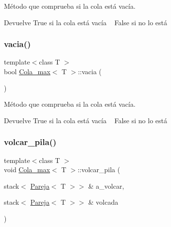 Método que comprueba si la cola está vacía. 

\begin{DoxyReturn}{Devuelve}
True si la cola está vacía ~\newline
 False si no lo está 
\end{DoxyReturn}
\mbox{\label{classCola__max_af0b18f86af91ef94d7a035f87a4dcb2b}} 
\subsubsection{\texorpdfstring{vacia()}{vacia()}\hspace{0.1cm}{\footnotesize\ttfamily [2/2]}}
{\footnotesize\ttfamily template$<$class T $>$ \\
bool \hyperlink{classCola__max}{Cola\+\_\+max}$<$ T $>$\+::vacia (\begin{DoxyParamCaption}{ }\end{DoxyParamCaption})}



Método que comprueba si la cola está vacía. 

\begin{DoxyReturn}{Devuelve}
True si la cola está vacía ~\newline
 False si no lo está 
\end{DoxyReturn}
\mbox{\label{classCola__max_af3e9275233822fa1d64149b10262dff3}} 
\subsubsection{\texorpdfstring{volcar\+\_\+pila()}{volcar\_pila()}}
{\footnotesize\ttfamily template$<$class T $>$ \\
void \hyperlink{classCola__max}{Cola\+\_\+max}$<$ T $>$\+::volcar\+\_\+pila (\begin{DoxyParamCaption}\item[{stack$<$ \hyperlink{structPareja}{Pareja}$<$ T $>$$>$ \&}]{a\+\_\+volcar,  }\item[{stack$<$ \hyperlink{structPareja}{Pareja}$<$ T $>$$>$ \&}]{volcada }\end{DoxyParamCaption})\hspace{0.3cm}{\ttfamily [private]}}



